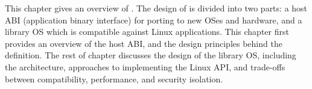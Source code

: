 This chapter gives an overview of \graphene{}.
The design of \graphene{} is divided into two parts:
a host ABI (application binary interface) for porting to new OSes and hardware,
and a library OS which is compatible against Linux applications.
This chapter first provides an overview of the host ABI, and the design principles behind the definition.
The rest of chapter
discusses the design of the library OS, including the architecture,
approaches to implementing the Linux API,
and trade-offs between compatibility, performance, and security isolation.


